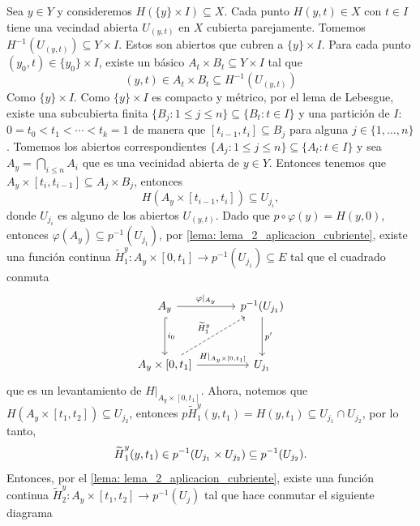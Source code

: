 \begin{dem}
    Sea $y\in Y$ y consideremos $H(\{y\}\times I)\subseteq X$. Cada punto $H(y,t)\in X$ con $t\in I$ tiene una vecindad abierta $U_{(y,t)}$ en $X$ cubierta parejamente. Tomemos $H^{-1}(U_{(y,t)})\subseteq Y\times I$. Estos son abiertos que cubren a $\{y\}\times I$. Para cada punto $(y_0,t)\in \{y_0\}\times I$, existe un básico $A_t\times B_t\subseteq Y\times I$ tal que
    \begin{equation*}
        (y,t)\in A_t\times B_t\subseteq H^{-1}(U_{(y,t)})
    \end{equation*}
    Como $\{y\}\times I$. Como $\{y\}\times I$ es compacto y métrico, por el lema de Lebesgue, existe una subcubierta finita $\{B_j:1\leq j \leq n\}\subseteq\{B_t:t\in I\}$ y una partición de $I$: $0=t_0<t_1<\cdots<t_k=1$ de manera que $[t_{i-1},t_i]\subseteq B_j$ para alguna $j\in\{1,\ldots,n\}$. Tomemos los abiertos correspondientes  $\{A_j:1\leq j \leq n\}\subseteq\{A_t:t\in I\}$ y sea 
    $A_y=\bigcap_{i\leq n}A_i$ que es una vecinidad abierta de $y\in Y$. Entonces tenemos que $A_y\times [t_{i},t_{i-1}]\subseteq A_j\times B_j$, entonces
    \begin{equation*}
        H(A_y\times [t_{i-1},t_i])\subseteq U_{j_i},
    \end{equation*}
    donde $U_{j_i}$ es alguno de los abiertos $U_{(y,t)}$. Dado que $p\circ\varphi(y)=H(y,0)$, entonces $\varphi(A_y)\subseteq p^{-1}(U_{j_1})$, por \ref{lema: lema_2_aplicacion_cubriente}, existe una función continua $\widetilde{H}^{y}_1:A_y\times [0,t_1]\to p^{-1}(U_{j_1})\subseteq E$ tal que el cuadrado conmuta
    \begin{equation*}
        \begin{tikzcd}[column sep=1.2cm, row sep =1.2cm]
        A_y\arrow["\varphi|_{A_y}",r] \arrow["i_0", hook,d] & p^{-1}(U_{j_1})\arrow[d, "p'"]\\
        A_y\times [0,t_1]\arrow[r, "H|_{A_y\times [0,t_1]}"]\arrow[ur, "\widetilde{H}_1^y", dashed] & U_{j_1}
        \end{tikzcd}
    \end{equation*}
    que es un levantamiento de $H|_{A_y\times [0,t_1]}$. 
    Ahora, notemos que $H(A_y\times [t_1,t_2])\subseteq U_{j_2}$, entonces $p\widetilde{H}^{y}_1(y,t_1)=H(y,t_1)\subseteq U_{j_1}\cap U_{j_2}$, por lo tanto,
    \begin{equation*}
        \widetilde{\rule{0pt}{1.6ex}H}^y_1(y,t_1)\in p^{-1}(U_{j_1}\times U_{j_2})\subseteq p^{-1}(U_{j_2}).
    \end{equation*}
    Entonces, por el \ref{lema: lema_2_aplicacion_cubriente}, existe una función continua $\widetilde{H}_2^y:A_y\times[t_1,t_2]\to p^{-1}(U_{j})$ tal que hace conmutar el siguiente diagrama

\end{dem}
